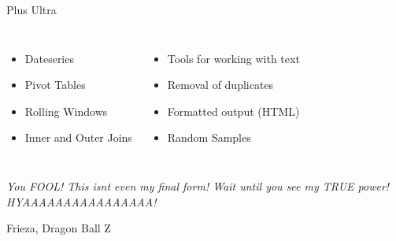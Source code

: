 
\begin{frame}{Plus Ultra}
%
\begin{columns}[T]
\begin{itemize}
\item Dateseries
\item Pivot Tables
\item Rolling Windows
\item Inner and Outer Joins
\end{itemize}
%
\begin{itemize}
\item Tools for working with text
\item Removal of duplicates
\item Formatted output (HTML)
\item Random Samples
\end{itemize}
\end{columns}

\vspace{12pt}
\begin{center}
\emph{You FOOL! This isnt even my final form! Wait until you see my TRUE power! HYAAAAAAAAAAAAAAAA!}
\end{center}
\begin{flushright}
\scriptsize
Frieza, Dragon Ball Z
\end{flushright}
%
%
\end{frame}
